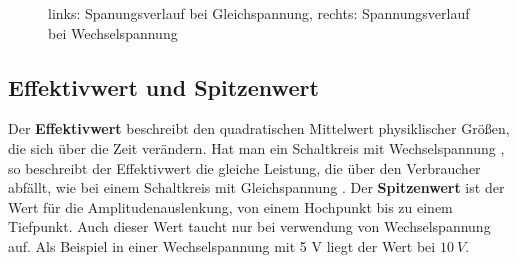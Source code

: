 \begin{figure}[ht!]
\begin{minipage}[b]{.45\linewidth}
            \end{minipage}
            
            \caption{links: Spanungsverlauf bei Gleichspannung, rechts: Spannungsverlauf bei Wechselspannung}
            \label{fig:spannung}
        \end{figure}
       

        \subsection{Effektivwert und Spitzenwert}
            Der \textbf{Effektivwert} beschreibt den quadratischen Mittelwert physiklischer Größen, die sich über die Zeit verändern. Hat man ein Schaltkreis mit Wechselspannung , so beschreibt der Effektivwert die gleiche Leistung, die über den Verbraucher abfällt, wie bei einem Schaltkreis mit Gleichspannung .
            Der \textbf{Spitzenwert} ist der Wert für die Amplitudenauslenkung, von einem Hochpunkt bis zu einem Tiefpunkt. Auch dieser Wert taucht nur bei verwendung von Wechselspannung auf. Als Beispiel in einer Wechselspannung mit 5 V  liegt der Wert bei $10\ V$.

